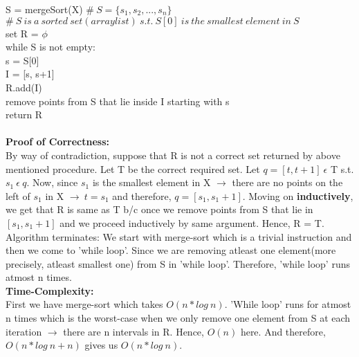\documentclass{article}
\newcommand\tab[1][4mm]{\hspace*{#1}}
\begin{document}
\tab S = mergeSort(X) $\#\ S = \{s_1, s_2, . . . , s_n\}$ \\
\tab $\#\ S\ is\ a\ sorted\ set(arraylist)\ s.t.\ S[0]\ is\ the\ smallest\ element\ in\ S$ \\
\tab set R = $\phi$ \\
\tab while S is not empty: \\
\tab\tab s = S[0] \\
\tab\tab I = [s, s+1] \\
\tab\tab R.add(I) \\
\tab\tab remove points from S that lie inside I starting with s \\
\tab return R \\
\vspace{0.5mm} \\
\textbf{Proof of Correctness:} \\
By way of contradiction, suppose that R is not a correct set returned by above mentioned procedure. Let T be the correct required set. Let $q = [t, t+1]\ \epsilon$ T s.t. $s_1\ \epsilon\ q$. Now, since $s_1$ is the smallest element in X $\rightarrow$ there are no points on the left of $s_1$ in X $\rightarrow\ t = s_1$ and therefore, $q = [s_1, s_1+1]$. Moving on \textbf{inductively}, we get that R is same as T b/c once we remove points from S that lie in $[s_1, s_1+1]$ and we proceed inductively by same argument. Hence, R = T. \\
Algorithm terminates: We start with merge-sort which is a trivial instruction and then we come to 'while loop'. Since we are removing atleast one element(more precisely, atleast smallest one) from S in 'while loop'. Therefore, 'while loop' runs atmost n times. 
\vspace{0.5mm} \\
\textbf{Time-Complexity:} \\
First we have merge-sort which takes $O(n*log\ n)$. 
'While loop' runs for atmost n times which is the worst-case when we only remove one element from S at each iteration $\rightarrow$   there are n intervals in R. Hence, $O(n)$ here. And therefore, $O(n*log\ n + n)$ gives us $O(n*log\ n)$. 
\end{document}
